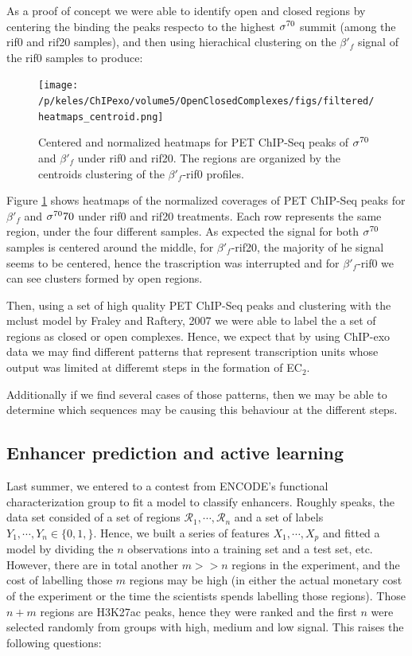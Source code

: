 \documentclass[11pt]{article}\usepackage[]{graphicx}\usepackage[]{color}
\begin{document}
As a proof of concept we were able to identify open and closed regions
by centering the binding the peaks respecto to the highest $\sigma^{70}$
summit (among the rif0 and rif20 samples), and then using hierachical
clustering on the $\beta'_f$ signal of the rif0 samples to produce:

\begin{figure}[H]
  \centering
 \texttt{[image: /p/keles/ChIPexo/volume5/OpenClosedComplexes/figs/filtered/heatmaps\_centroid.png]}
 \caption{Centered and normalized heatmaps for PET ChIP-Seq peaks of
   $\sigma^{70}$ and $\beta'_f$ under rif0 and rif20. The regions are
   organized by the centroids clustering of the $\beta'_f$-rif0
   profiles.}
  \label{fig:hm1}
\end{figure}

Figure \ref{fig:hm1} shows heatmaps of the normalized coverages of PET
ChIP-Seq peaks for $\beta'_f$ and $\sigma^{70}70$ under rif0 and rif20
treatments. Each row represents the same region, under the four
different samples. As expected the signal for both $\sigma^{70}$ samples is
centered around the middle, for $\beta'_f$-rif20, the majority of he
signal seems to be centered, hence the trascription was interrupted
and for $\beta'_f$-rif0 we can see clusters formed by open regions.

Then, using a set of high quality PET ChIP-Seq peaks and clustering
with the mclust model by Fraley and Raftery, 2007 \cite{mclust} we
were able to label the a set of regions as closed or open
complexes. Hence, we expect that by using ChIP-exo data we may find
different patterns that represent transcription units whose output was
limited at differemt steps in the formation of EC$_2$.

Additionally if we find several cases of those patterns, then we may
be able to determine which sequences may be causing this behaviour at
the different steps.

\subsection{Enhancer prediction and active learning}
\label{sec:enhancer}

Last summer, we entered to a contest from ENCODE's functional
characterization group to fit a model to classify enhancers. Roughly
speaks, the data set consided of a set of regions
$\mathcal{R}_1,\cdots,\mathcal{R}_n$ and a set of labels
$Y_1,\cdots,Y_n \in \{0,1,\}$. Hence, we built a series of features
$X_1,\cdots,X_p$ and fitted a model by dividing the $n$ observations
into a training set and a test set, etc. However, there are in total
another $m >> n$ regions in the experiment, and the cost of labelling
those $m$ regions may be high (in either the actual monetary cost of
the experiment or the time the scientists spends labelling those
regions). Those $n+m$ regions are H3K27ac peaks, hence they were
ranked and the first $n$ were selected randomly from groups with high,
medium and low signal. This raises the following questions:
\end{document}
